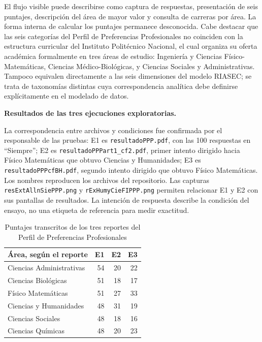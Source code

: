 El flujo visible puede describirse como captura de respuestas, presentación de seis puntajes, descripción del área de mayor valor y consulta de carreras por área. La forma interna de calcular los puntajes permanece desconocida. Cabe destacar que las seis categorías del Perfil de Preferencias Profesionales no coinciden con la estructura curricular del Instituto Politécnico Nacional, el cual organiza su oferta académica formalmente en tres áreas de estudio: Ingeniería y Ciencias Físico-Matemáticas, Ciencias Médico-Biológicas, y Ciencias Sociales y Administrativas. Tampoco equivalen directamente a las seis dimensiones del modelo RIASEC; se trata de taxonomías distintas cuya correspondencia analítica debe definirse explícitamente en el modelado de datos.

\noindent\textbf{Resultados de las tres ejecuciones exploratorias.}\par\smallskip

La correspondencia entre archivos y condiciones fue confirmada por el responsable de las pruebas: E1 es \nolinkurl{resultadoPPP.pdf}, con las 100 respuestas en ``Siempre''; E2 es \nolinkurl{resultadoPPPart1_cf2.pdf}, primer intento dirigido hacia Físico Matemáticas que obtuvo Ciencias y Humanidades; E3 es \nolinkurl{resultadoPPPcfBH.pdf}, segundo intento dirigido que obtuvo Físico Matemáticas. Los nombres reproducen los archivos del repositorio. Las capturas \nolinkurl{resExtAllnSiePPP.png} y \nolinkurl{rExHumyCieFIPPP.png} permiten relacionar E1 y E2 con sus pantallas de resultados. La intención de respuesta describe la condición del ensayo, no una etiqueta de referencia para medir exactitud.

\begin{table}[htbp]
\centering
\small
\caption{Puntajes transcritos de los tres reportes del Perfil de Preferencias Profesionales}
\label{tab:resultados-ppp}
\begin{tabularx}{\textwidth}{Xrrr}
\toprule
\textbf{Área, según el reporte} & \textbf{E1} & \textbf{E2} & \textbf{E3} \\
\midrule
Ciencias Administrativas & 54 & 20 & 22 \\
Ciencias Biológicas & 51 & 18 & 17 \\
Físico Matemáticas & 51 & 27 & 33 \\
Ciencias y Humanidades & 48 & 31 & 19 \\
Ciencias Sociales & 48 & 18 & 16 \\
Ciencias Químicas & 48 & 20 & 23 \\
\bottomrule
\end{tabularx}
\end{table}

